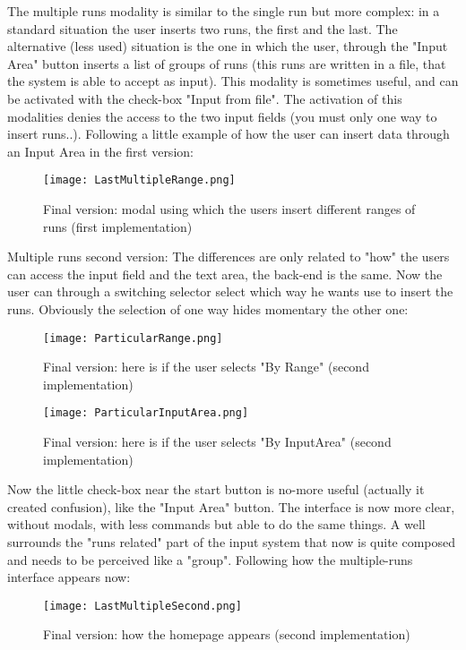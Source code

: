 The multiple runs modality is similar to the single run but more complex: in a standard situation the user inserts two runs, the first and the last. The alternative (less used) situation is the one in which the user, through the "Input Area" button inserts a list of groups of runs (this runs are written in a file, that the system is able to accept as input). This modality is sometimes useful, and can be activated with the check-box "Input from file". The activation of this modalities denies the access to the two input fields (you must only one way to insert runs..).
Following a little example of how the user can insert data through an Input Area in the first version:

\begin{figure}[H]
\centering
\texttt{[image: LastMultipleRange.png]} 
\caption{Final version: modal using which the users insert different ranges of runs (first implementation)}
\end{figure}   

Multiple runs second version:
The differences are only related to "how" the users can access the input field and the text area, the back-end is the same. Now the user can through a switching selector select which way he wants use to insert the runs. Obviously the selection of one way hides momentary the other one:

\begin{figure}[H]
\centering
\texttt{[image: ParticularRange.png]} 
\caption{Final version: here is if the user selects "By Range" (second implementation)}
\end{figure}   

\begin{figure}[H]
\centering
\texttt{[image: ParticularInputArea.png]} 
\caption{Final version: here is if the user selects "By InputArea" (second implementation)}
\end{figure}   

Now the little check-box near the start button is no-more useful (actually it created confusion), like the "Input Area" button. The interface is now more clear, without modals, with less commands but able to do the same things. A well surrounds the "runs related" part of the input system that now is quite composed and needs to be perceived like a "group".
Following how the multiple-runs interface appears now:

\begin{figure}[H]
\centering
\texttt{[image: LastMultipleSecond.png]} 
\caption{Final version: how the homepage appears (second implementation)}
\end{figure}  


